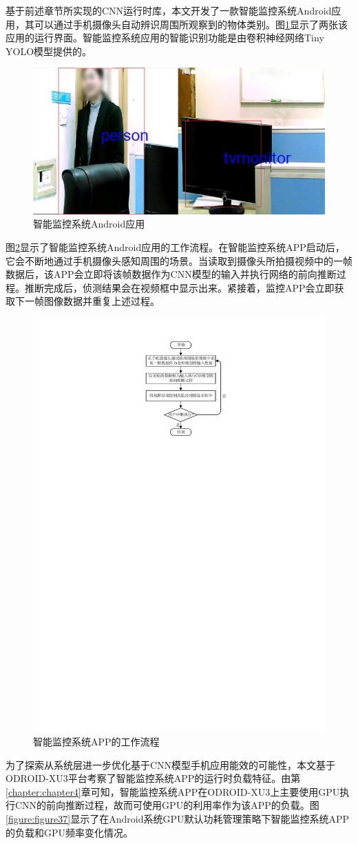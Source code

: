 基于前述章节所实现的CNN运行时库，本文开发了一款智能监控系统Android应用，其可以通过手机摄像头自动辨识周围所观察到的物体类别。图\ref{figure:figure31}显示了两张该应用的运行界面。智能监控系统应用的智能识别功能是由卷积神经网络Tiny YOLO\cite{pjreddie.com}模型提供的。

\begin{figure}[htbp]
    \centering
    \includegraphics[height=0.4\textwidth]{figures/app.pdf}
    \caption{智能监控系统Android应用}\label{figure:figure31}
\end{figure}

图\ref{figure:figure36}显示了智能监控系统Android应用的工作流程。在智能监控系统APP启动后，它会不断地通过手机摄像头感知周围的场景。当读取到摄像头所拍摄视频中的一帧数据后，该APP会立即将该帧数据作为CNN模型的输入并执行网络的前向推断过程。推断完成后，侦测结果会在视频框中显示出来。紧接着，监控APP会立即获取下一帧图像数据并重复上述过程。

\begin{figure}[htbp]
    \centering
    \includegraphics[height=0.5\textwidth]{figures/app_process.pdf}
    \caption{智能监控系统APP的工作流程}\label{figure:figure36}
\end{figure}

为了探索从系统层进一步优化基于CNN模型手机应用能效的可能性，本文基于ODROID-XU3平台考察了智能监控系统APP的运行时负载特征。由第\ref{chapter:chapter4}章可知，智能监控系统APP在ODROID-XU3上主要使用GPU执行CNN的前向推断过程，故而可使用GPU的利用率作为该APP的负载。图\ref{figure:figure37}显示了在Android系统GPU默认功耗管理策略下智能监控系统APP的负载和GPU频率变化情况。

